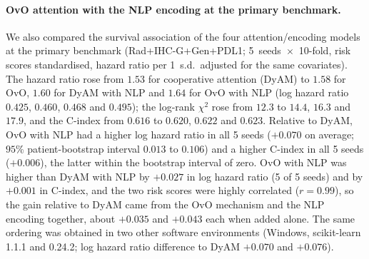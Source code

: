 \paragraph{OvO attention with the NLP encoding at the primary benchmark.}
We also compared the survival association of the four attention/encoding models at the primary benchmark
(Rad+IHC-G+Gen+PDL1; 5~seeds~$\times$~10-fold, risk scores standardised, hazard ratio per
1~s.d.\ adjusted for the same covariates).
The hazard ratio rose from $1.53$ for cooperative attention (DyAM) to $1.58$ for OvO, $1.60$ for DyAM with NLP and
$1.64$ for OvO with NLP (log hazard ratio $0.425$, $0.460$, $0.468$ and $0.495$); the log-rank $\chi^2$ rose from $12.3$
to $14.4$, $16.3$ and $17.9$, and the C-index from $0.616$ to $0.620$, $0.622$ and $0.623$.
Relative to DyAM, OvO with NLP had a higher log hazard ratio in all 5 seeds ($+0.070$ on average; $95\%$ patient-bootstrap
interval $0.013$ to $0.106$) and a higher C-index in all 5 seeds ($+0.006$), the latter within the bootstrap interval of zero.
OvO with NLP was higher than DyAM with NLP by $+0.027$ in log hazard ratio (5 of 5 seeds) and by $+0.001$ in C-index, and the two
risk scores were highly correlated ($r = 0.99$), so the gain relative to DyAM came from the OvO mechanism and the NLP encoding
together, about $+0.035$ and $+0.043$ each when added alone.
The same ordering was obtained in two other software environments (Windows, scikit-learn 1.1.1 and 0.24.2; log hazard ratio
difference to DyAM $+0.070$ and $+0.076$).

